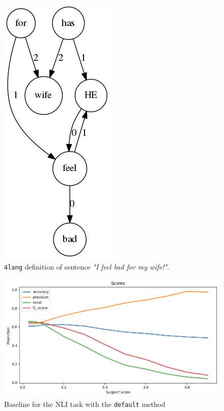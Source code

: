 \begin{figure}
	\centering
	\includegraphics[scale=0.5]{figures/ifeelbad}
	\caption{\texttt{4lang} definition of sentence \textit{"I feel bad for my wife!"}.}
	\label{fig:ifeelbad}
\end{figure}

\begin{figure}
	\centering
	\includegraphics[scale=0.5]{figures/nlidefault}
	\caption{Baseline for the NLI task with the \texttt{default} method}
	\label{fig:nlidefault}
\end{figure}

